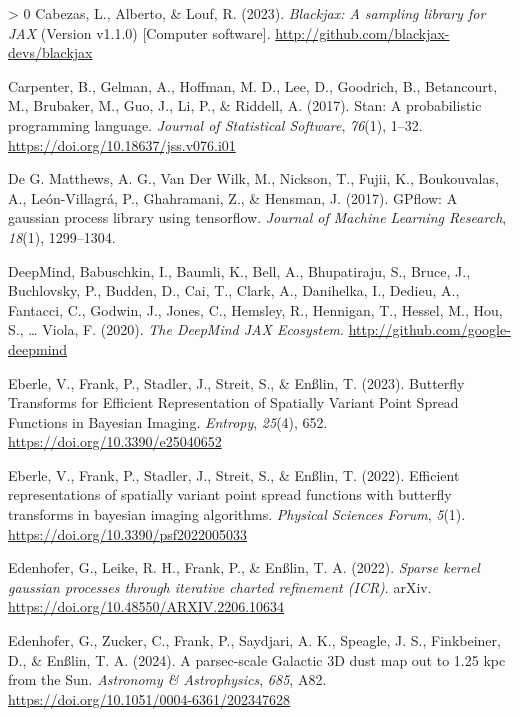 \documentclass[10pt,a4paper,onecolumn]{article}
\newlength{\cslhangindent}
\newenvironment{CSLReferences}[3] %
 {%
  \setlength{\parindent}{0pt}
  \ifodd #1 \everypar{\setlength{\hangindent}{\cslhangindent}}\ignorespaces\fi
  \ifnum #2 > 0
  \setlength{\parskip}{#2\baselineskip}
  \fi
 }%
 {}
\begin{document}
\begin{CSLReferences}{1}{0}
\leavevmode\hypertarget{ref-blackjax2020}{}%
Cabezas, L., Alberto, \& Louf, R. (2023). \emph{{B}lackjax: A sampling
library for {JAX}} (Version v1.1.0) {[}Computer software{]}.
\url{http://github.com/blackjax-devs/blackjax}

\leavevmode\hypertarget{ref-Carpenter2017}{}%
Carpenter, B., Gelman, A., Hoffman, M. D., Lee, D., Goodrich, B.,
Betancourt, M., Brubaker, M., Guo, J., Li, P., \& Riddell, A. (2017).
Stan: A probabilistic programming language. \emph{Journal of Statistical
Software}, \emph{76}(1), 1--32.
\url{https://doi.org/10.18637/jss.v076.i01}

\leavevmode\hypertarget{ref-Matthews2017}{}%
De G. Matthews, A. G., Van Der Wilk, M., Nickson, T., Fujii, K.,
Boukouvalas, A., León-Villagrá, P., Ghahramani, Z., \& Hensman, J.
(2017). GPflow: A gaussian process library using tensorflow.
\emph{Journal of Machine Learning Research}, \emph{18}(1), 1299--1304.

\leavevmode\hypertarget{ref-Deepmind2020Optax}{}%
DeepMind, Babuschkin, I., Baumli, K., Bell, A., Bhupatiraju, S., Bruce,
J., Buchlovsky, P., Budden, D., Cai, T., Clark, A., Danihelka, I.,
Dedieu, A., Fantacci, C., Godwin, J., Jones, C., Hemsley, R., Hennigan,
T., Hessel, M., Hou, S., \ldots{} Viola, F. (2020). \emph{The
{D}eep{M}ind {JAX} {E}cosystem}. \url{http://github.com/google-deepmind}

\leavevmode\hypertarget{ref-Eberle2023ButterflyImaging}{}%
Eberle, V., Frank, P., Stadler, J., Streit, S., \& Enßlin, T. (2023).
{Butterfly Transforms for Efficient Representation of Spatially Variant
Point Spread Functions in Bayesian Imaging}. \emph{Entropy},
\emph{25}(4), 652. \url{https://doi.org/10.3390/e25040652}

\leavevmode\hypertarget{ref-Eberle2023ButterflyImagingAlgorithm}{}%
Eberle, V., Frank, P., Stadler, J., Streit, S., \& Enßlin, T. (2022).
Efficient representations of spatially variant point spread functions
with butterfly transforms in bayesian imaging algorithms. \emph{Physical
Sciences Forum}, \emph{5}(1).
\url{https://doi.org/10.3390/psf2022005033}

\leavevmode\hypertarget{ref-Edenhofer2022}{}%
Edenhofer, G., Leike, R. H., Frank, P., \& Enßlin, T. A. (2022).
\emph{Sparse kernel gaussian processes through iterative charted
refinement (ICR)}. arXiv.
\url{https://doi.org/10.48550/ARXIV.2206.10634}

\leavevmode\hypertarget{ref-Edenhofer2023}{}%
Edenhofer, G., Zucker, C., Frank, P., Saydjari, A. K., Speagle, J. S.,
Finkbeiner, D., \& Enßlin, T. A. (2024). {A parsec-scale Galactic 3D
dust map out to 1.25 kpc from the Sun}. \emph{Astronomy \&
Astrophysics}, \emph{685}, A82.
\url{https://doi.org/10.1051/0004-6361/202347628}


\end{CSLReferences}
\end{document}
